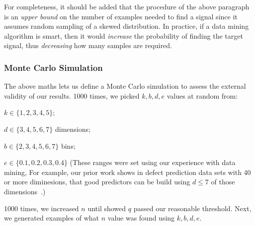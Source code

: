 For completeness, it should be added  that the procedure of the above paragraph is an {\em upper bound} on the
number of examples needed to find a signal since it
assumes random sampling of a skewed distribution. In
practice, if a data mining algorithm is smart, then
it would {\em increase} the probability of finding
the target signal, thus {\em decreasing} how many samples are required.

\subsubsection{Monte Carlo Simulation}
    The above maths lets us define
    a  Monte Carlo simulation to assess the external validity of our results.
    1000 times, we picked $k,b,d,e$ values at random from:
    \bi
      \item $k \in \{1,2,3,4,5\}$;
  \item $d \in \{3,4,5,6,7\}$ dimensions;
  \item $b \in \{2,3,4,5,6,7\}$ bins; 
    \item $e\in \{0.1,0.2,0.3,0.4\}$
      \ei
      (These ranges were set using our experience with data mining, For example, our prior work shows in defect prediction data sets
      with 40 or more diminesions, that good predictors can be build using $d\le 7$ of those dimensions~\cite{Menzies07}.)
      
     1000 times,
     we increased $n$ until  showed  $q$ passed our reasonable threshold.
     Next, we generated examples of what $n$ value was found using  $k,b,d,e$.
     
